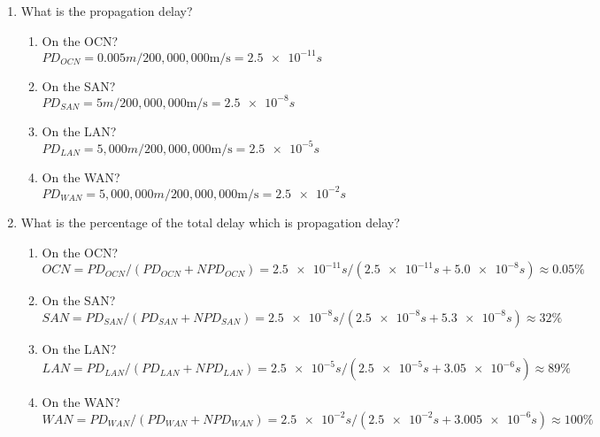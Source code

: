 \documentclass[10pt]{amsart}
\begin{document}
\begin{enumerate}
\begin{enumerate}
        \item What is the propagation delay?
        \begin{enumerate}
            \item On the OCN?\\
                $PD_{OCN} = 0.005m / 200,000,000\si{\meter\per\second} = \num{2.5e-11}s$
            \item On the SAN?\\
                $PD_{SAN} = 5m / 200,000,000\si{\meter\per\second} = \num{2.5e-8}s$
            \item On the LAN?\\
                $PD_{LAN} = 5,000m / 200,000,000\si{\meter\per\second} = \num{2.5e-5}s$
            \item On the WAN?\\
                $PD_{WAN} = 5,000,000m / 200,000,000\si{\meter\per\second} = \num{2.5e-2}s$
        \end{enumerate}
        
        \item What is the percentage of the total delay which is propagation delay?
        \begin{enumerate}
            \item On the OCN?\\
                $OCN = PD_{OCN} / (PD_{OCN} + NPD_{OCN}) = \num{2.5e-11}s / (\num{2.5e-11}s
                    + \num{5.0e-8}s) \approx 0.05\%$
            \item On the SAN?\\
                $SAN = PD_{SAN} / (PD_{SAN} + NPD_{SAN}) = \num{2.5e-8}s / (\num{2.5e-8}s +
                    \num{5.3e-8}s) \approx 32\%$
            \item On the LAN?\\
                $LAN = PD_{LAN} / (PD_{LAN} + NPD_{LAN}) = \num{2.5e-5}s / (\num{2.5e-5}s +
                    \num{3.05e-6}s) \approx 89\%$
            \item On the WAN?\\
                $WAN = PD_{WAN} / (PD_{WAN} + NPD_{WAN}) = \num{2.5e-2}s / (\num{2.5e-2}s +
                    \num{3.005e-6}s) \approx 100\%$
        \end{enumerate}
    \end{enumerate}


\end{enumerate}
\end{document}
